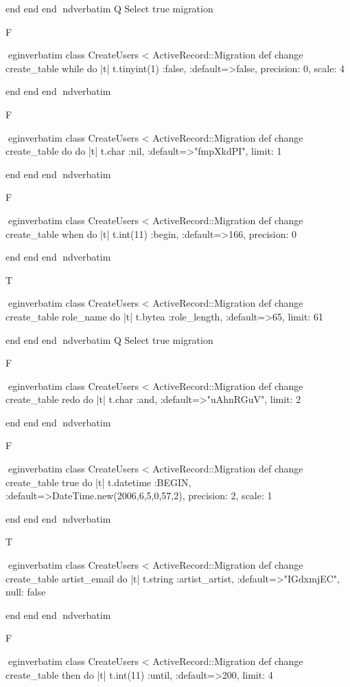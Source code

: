     end 
  end 
end
nd{verbatim}
Q
 Select true migration

F

egin{verbatim}
 class CreateUsers < ActiveRecord::Migration 
  def change 
    create_table while do |t| 
      t.tinyint(1) :false, :default=>false, precision: 0, scale: 4
    
    end 
  end 
end
nd{verbatim}

F

egin{verbatim}
 class CreateUsers < ActiveRecord::Migration 
  def change 
    create_table do do |t| 
      t.char :nil, :default=>"fmpXkdPI", limit: 1
    
    end 
  end 
end
nd{verbatim}

F

egin{verbatim}
 class CreateUsers < ActiveRecord::Migration 
  def change 
    create_table when do |t| 
      t.int(11) :begin, :default=>166, precision: 0
    
    end 
  end 
end
nd{verbatim}

T

egin{verbatim}
 class CreateUsers < ActiveRecord::Migration 
  def change 
    create_table role_name do |t| 
      t.bytea :role_length, :default=>65, limit: 61
    
    end 
  end 
end
nd{verbatim}
Q
 Select true migration

F

egin{verbatim}
 class CreateUsers < ActiveRecord::Migration 
  def change 
    create_table redo do |t| 
      t.char :and, :default=>"uAhnRGuV", limit: 2
    
    end 
  end 
end
nd{verbatim}

F

egin{verbatim}
 class CreateUsers < ActiveRecord::Migration 
  def change 
    create_table true do |t| 
      t.datetime :BEGIN, :default=>DateTime.new(2006,6,5,0,57,2), precision: 2, scale: 1
    
    end 
  end 
end
nd{verbatim}

T

egin{verbatim}
 class CreateUsers < ActiveRecord::Migration 
  def change 
    create_table artist_email do |t| 
      t.string :artist_artist, :default=>"IGdxmjEC", null: false
    
    end 
  end 
end
nd{verbatim}

F

egin{verbatim}
 class CreateUsers < ActiveRecord::Migration 
  def change 
    create_table then do |t| 
      t.int(11) :until, :default=>200, limit: 4
    
